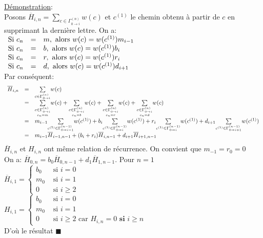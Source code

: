 		\underline{Démonstration}:\\
			Posons $\overline{H}_{i,n}=\underset{c\in \Gamma^{(n)}_{0 \to i}}{\sum}w(c)$ et $c^{(1)}$ le chemin obtenu à partir de $c$ en supprimant la dernière lettre. On a:\\
			$
			\begin{array}{r c l}
				\text{Si }c_{n}&=&m, \text{ alors }w(c)=w(c^{(1)})m_{i-1}\\
				\text{Si }c_{n}&=&b, \text{ alors }w(c)=w(c^{(1)})b_{i}\\
				\text{Si }c_{n}&=&r, \text{ alors }w(c)=w(c^{(1)})r_{i}\\
				\text{Si }c_{n}&=&d, \text{ alors }w(c)=w(c^{(1)})d_{i+1}
			\end{array}
			$\\
			Par conséquent:\\
			\[
				\begin{array}{r c l}
					\overline{H}_{i,n}&=&\underset{c\in\Gamma^{(n)}_{0 \to i}}{\sum}w(c)\\
					&=&\underset{\scriptstyle\underset{c_{n}=m}{ c\in \Gamma^{(n)}_{0 \to i}}}{\sum}w(c)+\underset{\scriptstyle \underset{c_{n}=b}{c\in \Gamma^{(n)}_{0 \to i}}}{\sum}w(c)+\underset{\scriptstyle \underset{c_{n}=r}{c\in \Gamma^{(n)}_{0 \to i}}}{\sum}w(c)+\underset{\scriptstyle \underset{c_{n}=d}{c\in \Gamma^{(n)}_{0 \to i}}}{\sum}w(c)\\
					&=&m_{i-1}\underset{c^{(1)}\in \Gamma^{(n-1)}_{0 \to i-1}}{\sum}w(c^{(1)})+b_{i}\underset{c^{(1)}\in\Gamma^{(n-1)}_{0 \to i}}{\sum}w(c^{(1)})+r_{i}\underset{c^{(1)}\in \Gamma^{(n-1)}_{0 \to i}}{\sum}w(c^{(1)})+d_{i+1}\underset{c^{(1)}\in\Gamma^{(n-1)}_{0 \to i+1}}{\sum}w(c^{(1)})\\
					&=&m_{i-1}\overline{H}_{i-1,n-1}+(b_{i}+r_{i})\overline{H}_{i,n-1}+d_{i+1}\overline{H}_{i+1,n-1}
				\end{array}
			\]
			$\overline{H}_{i,n}$ et $H_{i,n}$ ont même relation de récurrence.
			On convient que $m_{-1}=r_{0}=0$\\ On a: 
			$\overline{H}_{0,n}=b_{0}\overline{H}_{0,n-1}+d_{1}\overline{H}_{1,n-1}$.
			Pour $n=1$\\
			 $
			 	\overline{H}_{i,1}=\begin{cases}b_{0}&\text{ si }i=0\\m_{0}&\text{ si }i=1\\0&\text{ si }i\geq2 \end{cases}
			 $\\
			 $
			 	 H_{i,1}=\begin{cases} b_{0}&\text{ si }i=0\\m_{0}&\text{ si }i=1\\0&\text{ si }i\geq2 \text{ car }H_{i,n}=0 \textbf{ si }i\geq n\end{cases}
			 $\\
			D'où le résultat $\blacksquare$\\


